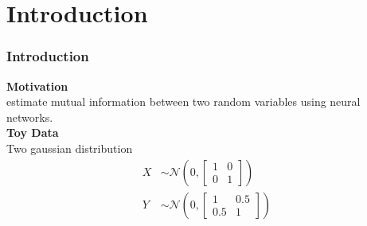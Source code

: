 \section{Introduction}
\begin{frame}
	\frametitle{Introduction}
	\textbf{Motivation} \\ estimate mutual information between two random variables using neural networks. \\
	\textbf{Toy Data} \\ Two gaussian distribution \\
	\begin{align*}
		X &\sim \mathcal{N}(0,
		\begin{bmatrix}
			1 & 0 \\
			0 & 1
		\end{bmatrix}) \\
		
		Y &\sim \mathcal{N}(0, 
		\begin{bmatrix}
			1 & 0.5 \\
			0.5 & 1
		\end{bmatrix})
	\end{align*}
	
\end{frame}